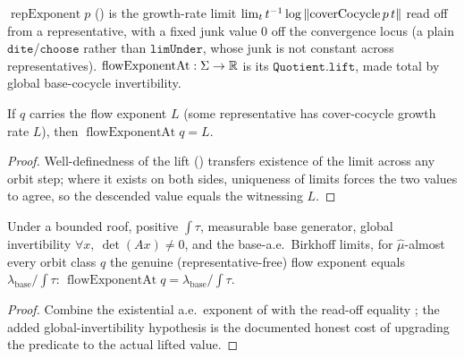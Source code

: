 \begin{definition}\label{thm:susp-flowExpAt}
  \leanok
  $\operatorname{repExponent} p$ () is the growth-rate limit
  $\lim_t t^{-1}\log\left\lVert \operatorname{coverCocycle} p\,t \right\rVert$ read off from a representative, with a
  fixed junk value $0$ off the convergence locus (a plain $\texttt{dite}$/$\texttt{choose}$ rather
  than $\texttt{limUnder}$, whose junk is not constant across representatives).
  $\operatorname{flowExponentAt} : \Sigma \to \mathbb{R}$ is its $\texttt{Quotient.lift}$, made total by
  global base-cocycle invertibility.
\end{definition}

\begin{theorem}\label{thm:susp-flowExpEq}
  \leanok
  If $q$ carries the flow exponent $L$ (some representative has cover-cocycle growth rate $L$),
  then $\operatorname{flowExponentAt} q = L$.
\end{theorem}
\begin{proof}\leanok
  Well-definedness of the lift () transfers existence of the limit across
  any orbit step; where it exists on both sides, uniqueness of limits forces the two values to
  agree, so the descended value equals the witnessing $L$.
\end{proof}

\begin{theorem}\label{thm:susp-flowExpAe}
  \leanok
  Under a bounded roof, positive $\int\tau$, measurable base generator, global invertibility
  $\forall x,\ \det(A x) \ne 0$, and the base-a.e.\ Birkhoff limits, for $\hat\mu$-almost every
  orbit class $q$ the genuine (representative-free) flow exponent equals
  $\lambda_{\mathrm{base}}/\int\tau$:
  $\operatorname{flowExponentAt} q = \lambda_{\mathrm{base}}/\int\tau$.
\end{theorem}
\begin{proof}\leanok
  Combine the existential a.e.\ exponent of  with the read-off equality
  ; the added global-invertibility hypothesis is the documented honest
  cost of upgrading the predicate to the actual lifted value.
\end{proof}

